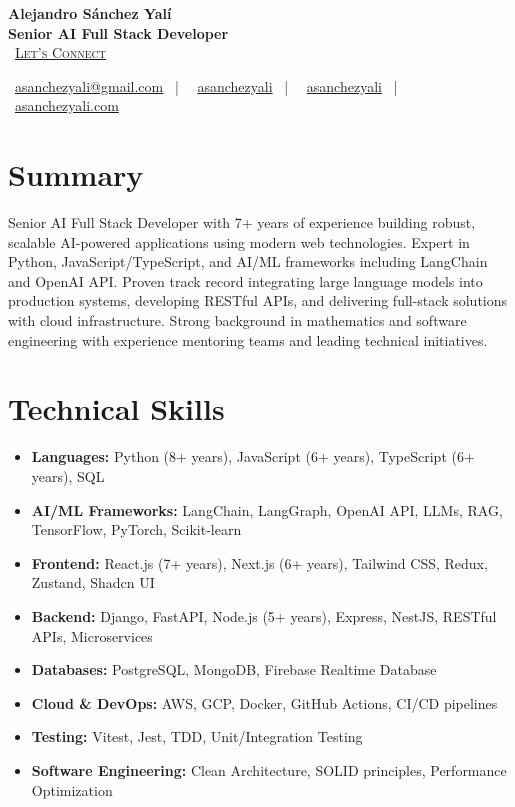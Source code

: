 \documentclass[letterpaper,11pt]{article}
\newcommand{\normalfaCalendar}{{\mdseries\faCalendar}}
\newcommand{\normalfaEnvelope}{{\mdseries\faEnvelope}}
\newcommand{\normalfaLinkedin}{{\mdseries\faLinkedin}}
\newcommand{\normalfaGithub}{{\mdseries\faGithub}}
\newcommand{\normalfaGlobe}{{\mdseries\faGlobe}}
\begin{document}
\begin{center}
\textbf{\Huge Alejandro Sánchez Yalí}\\[0.2em]
\textbf{\Large Senior AI Full Stack Developer}\\[0.4em]
\small
\normalfaCalendar\ \href{https://cal.com/asanchezyali/full-time-opportunities}{\textsc{Let's Connect}}

\vspace{0.8em}
\normalfaEnvelope\ \href{mailto:asanchezyali@gmail.com}{asanchezyali@gmail.com}  ~|~
\normalfaLinkedin\ \href{https://www.linkedin.com/in/asanchezyali}{asanchezyali} ~|~
\normalfaGithub\ \href{https://github.com/asanchezyali}{asanchezyali}  ~|~
\normalfaGlobe\ \href{https://asanchezyali.com}{asanchezyali.com}
\end{center}

\section{Summary}
Senior AI Full Stack Developer with 7+ years of experience building robust, scalable AI-powered applications using modern web technologies. Expert in Python, JavaScript/TypeScript, and AI/ML frameworks including LangChain and OpenAI API. Proven track record integrating large language models into production systems, developing RESTful APIs, and delivering full-stack solutions with cloud infrastructure. Strong background in mathematics and software engineering with experience mentoring teams and leading technical initiatives.

\section{Technical Skills}
\begin{itemize}[leftmargin=*, itemsep=0pt]
  \item \textbf{Languages:} Python (8+ years), JavaScript (6+ years), TypeScript (6+ years), SQL
  \item \textbf{AI/ML Frameworks:} LangChain, LangGraph, OpenAI API, LLMs, RAG, TensorFlow, PyTorch, Scikit-learn
  \item \textbf{Frontend:} React.js (7+ years), Next.js (6+ years), Tailwind CSS, Redux, Zustand, Shadcn UI
  \item \textbf{Backend:} Django, FastAPI, Node.js (5+ years), Express, NestJS, RESTful APIs, Microservices
  \item \textbf{Databases:} PostgreSQL, MongoDB, Firebase Realtime Database
  \item \textbf{Cloud \& DevOps:} AWS, GCP, Docker, GitHub Actions, CI/CD pipelines
  \item \textbf{Testing:} Vitest, Jest, TDD, Unit/Integration Testing
  \item \textbf{Software Engineering:} Clean Architecture, SOLID principles, Performance Optimization
\end{itemize}
\end{document}
